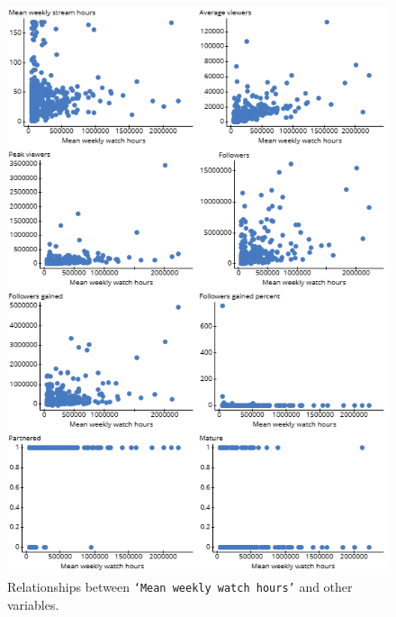 \documentclass[12pt]{article}
\begin{document}
\begin{figure}[H]
  \centering
  \includegraphics[width=0.8\linewidth]{../StatCrunch_Results/watch_scatter_plot_matrix.png}
  \captionsetup{justification=centering, singlelinecheck=false, margin=2cm}
  \caption[Watch Hours Scatter Plot Matrix]{Relationships between \texttt{`Mean weekly watch hours'} and other variables.}
  \label{fig:watch_scatter_matrix}
\end{figure}
\end{document}
